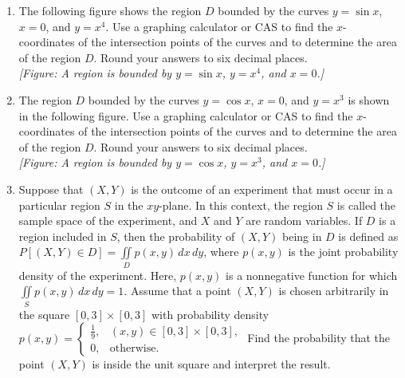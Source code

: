 \documentclass{exercises}
\begin{document}
\begin{enumerate}[resume]
\begin{enumerate}[label=(\alph*)]
  \item Find the volume above the plane, inside the cylinder, and below the plane $z=2$.
\end{enumerate}
\item \techrequired The following figure shows the region $D$ bounded by the curves $y=\sin x$, $x=0$, and $y=x^{4}$. Use a graphing calculator or CAS to find the $x$-coordinates of the intersection points of the curves and to determine the area of the region $D$. Round your answers to six decimal places. \\ \textit{[Figure: A region is bounded by $y=\sin x$, $y=x^4$, and $x=0$.]}
\item \techrequired The region $D$ bounded by the curves $y=\cos x$, $x=0$, and $y=x^{3}$ is shown in the following figure. Use a graphing calculator or CAS to find the $x$-coordinates of the intersection points of the curves and to determine the area of the region $D$. Round your answers to six decimal places. \\ \textit{[Figure: A region is bounded by $y=\cos x$, $y=x^3$, and $x=0$.]}
\item Suppose that $(X,Y)$ is the outcome of an experiment that must occur in a particular region $S$ in the $xy$-plane. In this context, the region $S$ is called the sample space of the experiment, and $X$ and $Y$ are random variables. If $D$ is a region included in $S$, then the probability of $(X,Y)$ being in $D$ is defined as $P[(X,Y)\in D]=\underset{D}{\iint}p(x,y)\,dx\,dy$, where $p(x,y)$ is the joint probability density of the experiment. Here, $p(x,y)$ is a nonnegative function for which $\underset{S}{\iint}p(x,y)\,dx\,dy=1$. Assume that a point $(X,Y)$ is chosen arbitrarily in the square $[0,3]\times [0,3]$ with probability density $p(x,y)=\begin{cases}\frac{1}{9}, & (x,y)\in[0,3]\times [0,3], \\ 0, & \text{otherwise}.\end{cases}$ Find the probability that the point $(X,Y)$ is inside the unit square and interpret the result.

\end{enumerate}
\end{document}
